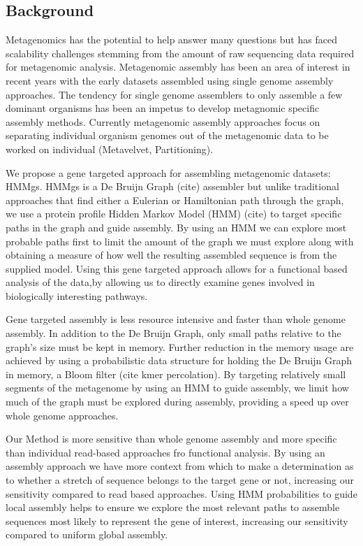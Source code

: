 \documentclass[10pt]{bmc_article}
\newenvironment{bmcformat}{\begin{raggedright}\baselineskip20pt\sloppy\setboolean{publ}{false}}{\end{raggedright}\baselineskip20pt\sloppy}
\begin{document}
\begin{bmcformat}
\section*{Background}Metagenomics has the potential to help answer many questions but has faced scalability challenges stemming from the amount of raw sequencing data required for metagenomic analysis.  Metagenomic assembly has been an area of interest in recent years with the early datasets assembled using single genome assembly approaches.  The tendency for single genome assemblers to only assemble a few dominant organisms has been an impetus to develop metagnomic specific assembly methods.  Currently metagenomic assembly approaches focus on separating individual organism genomes out of the metagenomic data to be worked on individual (Metavelvet, Partitioning).  

We propose a gene targeted approach for assembling metagenomic datasets: HMMgs.  HMMgs is a De Bruijn Graph (cite) assembler but unlike traditional approaches that find either a Eulerian or Hamiltonian path through the graph, we use a protein profile Hidden Markov Model (HMM) (cite) to target specific paths in the graph and guide assembly. By using an HMM we can explore most probable paths first to limit the amount of the graph we must explore along with obtaining a measure of how well the resulting assembled sequence is from the supplied model.  Using this gene targeted approach allows for a functional based analysis of the data,by allowing us to directly examine genes involved in biologically interesting pathways.

Gene targeted assembly is less resource intensive and faster than whole genome assembly.  In addition to the De Bruijn Graph, only small paths relative to the graph's size must be kept in memory.  Further reduction in the memory usage are achieved by using a probabilistic data structure for holding the De Bruijn Graph in memory, a Bloom filter \cite{Bloom1970} (cite kmer percolation).  By targeting relatively small segments of the metagenome by using an HMM to guide assembly, we limit how much of the graph must be explored during assembly, providing a speed up over whole genome approaches.

Our Method is more sensitive than whole genome assembly and more specific than individual read-based approaches fro functional analysis.  By using an assembly approach we have more context from which to make a determination as to whether a stretch of sequence belongs to the target gene or not, increasing our sensitivity compared to read based approaches.  Using HMM probabilities to guide local assembly helps to ensure we explore the most relevant paths to assemble sequences most likely to represent the gene of interest, increasing our sensitivity compared to uniform global assembly.


\end{bmcformat}
\end{document}
